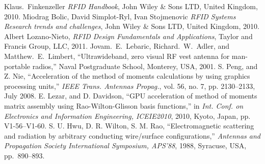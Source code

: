 \begin{thebibliography}{99}
%
Klaus.~Finkenzeller \emph{RFID Handbook}, John Wiley & Sons LTD, United Kingdom, 2010.
%
Miodrag Bolic, David Simplot-Ryl, Ivan Stojmenovic \emph{RFID Systems Research trends and challenges}, John Wiley & Sons LTD, United Kingdom, 2010.
%
Albert Lozano-Nieto, \emph{RFID Design Fundamentals and Applications}, Taylor and Francis Group, LLC, 2011.
%
Jovam.~E.~Lebaric, Richard.~W.~Adler, and Matthew.~E.~Limbert, ``Ultrawideband, zero visual RF vest antenna for man-portable radios,'' Naval Postgraduate School, Monterey, USA, 2001. 
%
S. Peng, and Z. Nie, ``Acceleration of the method of moments calculations by using graphics processing units,'' \emph{IEEE Trans. Antennas Propag.}, vol. 56, no. 7, pp. 2130--2133, July 2008.
%
E. Lezar, and D. Davidson, ``GPU acceleration of method of moments
matrix assembly using Rao-Wilton-Glisson basis functions,'' in \emph{Int. Conf.
on Electronics and Information Engineering, ICEIE2010}, 2010, Kyoto,
Japan, pp. V1-56--V1-60.
%
%
S. U. Hwu, D. R. Wilton, S. M. Rao, ``Electromagnetic scattering and radiation by arbitrary conducting wire/surface configurations,'' \emph{Antennas and Propagation Society International Symposium, APS'88}, 1988, Syracuse, USA, pp.~890--893. 
%
\end{thebibliography}

